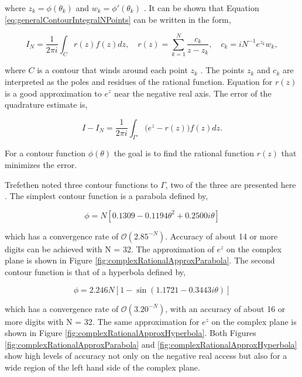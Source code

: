 \noindent where $z_{k} = \phi(\theta_{k})$ and  $w_{k} = \phi'(\theta_{k})$ \cite{Trefethen2006}. It can be shown that Equation \ref{eq:generalContourIntegralNPoints} can be written in the form,

\begin{equation}
    I_{N} = \frac{1}{2\pi i}\int_{C}r(z)f(z)dz, \quad r(z) = \sum_{k=1}^{N}\frac{c_{k}}{z-z_{k}}, \quad c_{k} = iN^{-1}e^{z_{k}}w_{k},
\end{equation}

\noindent where $C$ is a contour that winds around each point $z_{k}$ \cite{Trefethen2006}. The points $z_{k}$ and $c_{k}$ are interpreted as the poles and residues of the rational function. Equation for $r(z)$ is a good approximation to $e^{z}$ near the negative real axis. The error of the quadrature estimate is,

\begin{equation}
    I - I_{N} = \frac{1}{2\pi i}\int_{\Gamma'} \big(e^{z} - r(z)\big)f(z)dz.
\end{equation}{}

\noindent For a contour function $\phi(\theta)$ the goal is to find the rational function $r(z)$ that minimizes the error. 

Trefethen noted three contour functions to $\Gamma$, two of the three are presented here \cite{Trefethen2006}. The simplest contour function is a parabola defined by, 

\begin{equation}
    \phi = N[0.1309 - 0.1194\theta^{2} + 0.2500i\theta]
    \label{eq:parabolicContour}
\end{equation}

\noindent which has a convergence rate of $\mathcal{O}(2.85^{-N} )$. Accuracy of about 14 or more digits can be achieved with N = 32. The approximation of $e^{z}$ on the complex plane is shown in Figure \ref{fig:complexRationalApproxParabola}. The second contour function is that of a hyperbola defined by, 

\begin{equation}
    \phi = 2.246N[1 - \sin(1.1721 - 0.3443i\theta)]
    \label{eq:hyperbolicContour}
\end{equation}

\noindent which has a convergence rate of $\mathcal{O}(3.20^{-N} )$, with an accuracy of about 16 or more digits with N = 32. The same approximation for $e^{z}$ on the complex plane is shown in Figure \ref{fig:complexRationalApproxHyperbola}. Both Figures \ref{fig:complexRationalApproxParabola} and \ref{fig:complexRationalApproxHyperbola} show high levels of accuracy not only on the negative real access but also for a wide region of the left hand side of the complex plane. 

